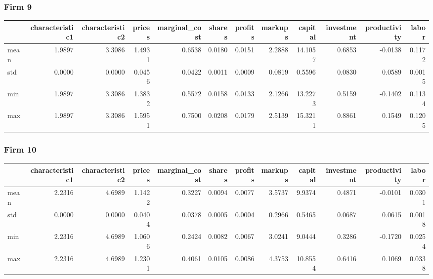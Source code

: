  \subsubsection*{Firm 9}
\begin{tabular}{lrrrrrrrrrrr}
\toprule
{} &  characteristic1 &  characteristic2 &  prices &  marginal\_cost &  shares &  profits &  markups &  capital &  investment &  productivity &  labor \\
\midrule
mean &           1.9897 &           3.3086 &  1.4931 &         0.6538 &  0.0180 &   0.0151 &   2.2888 &  14.1057 &      0.6853 &       -0.0138 & 0.1172 \\
std  &           0.0000 &           0.0000 &  0.0456 &         0.0422 &  0.0011 &   0.0009 &   0.0819 &   0.5596 &      0.0830 &        0.0589 & 0.0015 \\
min  &           1.9897 &           3.3086 &  1.3832 &         0.5572 &  0.0158 &   0.0133 &   2.1266 &  13.2273 &      0.5159 &       -0.1402 & 0.1134 \\
max  &           1.9897 &           3.3086 &  1.5951 &         0.7500 &  0.0208 &   0.0179 &   2.5139 &  15.3211 &      0.8861 &        0.1549 & 0.1205 \\
\bottomrule
\end{tabular}


 \subsubsection*{Firm 10}
\begin{tabular}{lrrrrrrrrrrr}
\toprule
{} &  characteristic1 &  characteristic2 &  prices &  marginal\_cost &  shares &  profits &  markups &  capital &  investment &  productivity &  labor \\
\midrule
mean &           2.2316 &           4.6989 &  1.1422 &         0.3227 &  0.0094 &   0.0077 &   3.5737 &   9.9374 &      0.4871 &       -0.0101 & 0.0301 \\
std  &           0.0000 &           0.0000 &  0.0404 &         0.0378 &  0.0005 &   0.0004 &   0.2966 &   0.5465 &      0.0687 &        0.0615 & 0.0018 \\
min  &           2.2316 &           4.6989 &  1.0606 &         0.2424 &  0.0082 &   0.0067 &   3.0241 &   9.0444 &      0.3286 &       -0.1720 & 0.0254 \\
max  &           2.2316 &           4.6989 &  1.2301 &         0.4061 &  0.0105 &   0.0086 &   4.3753 &  10.8554 &      0.6416 &        0.1069 & 0.0338 \\
\bottomrule
\end{tabular}


